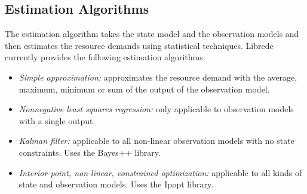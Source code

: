 \subsection{Estimation Algorithms}
The estimation algorithm takes the state model and the observation models and then estimates the resource demands using statistical techniques. Librede currently provides the following estimation algorithms:
\begin{itemize}
\item \emph{Simple approximation:} approximates the resource demand with the average, maximum, minimum or sum of the output of the observation model.
\item \emph{Nonnegative least squares regression:} only applicable to observation models with a single output.
\item \emph{Kalman filter:} applicable to all non-linear observation models with no state constraints. Uses the Bayes++ library.
\item \emph{Interior-point, non-linear, constrained optimization:} applicable to all kinds of state and observation models. Uses the Ipopt library.
\end{itemize}

